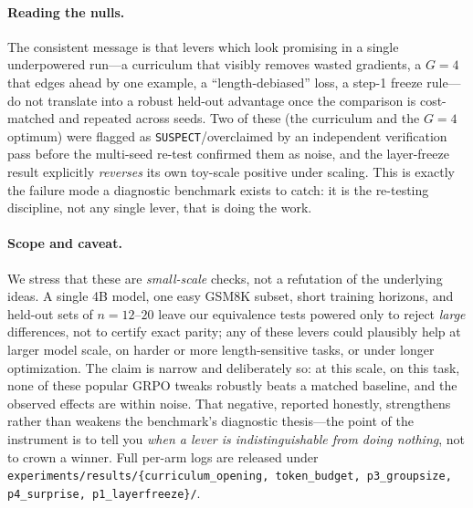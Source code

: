 \paragraph{Reading the nulls.}
The consistent message is that levers which look promising in a single
underpowered run---a curriculum that visibly removes wasted gradients, a
$G{=}4$ that edges ahead by one example, a ``length-debiased'' loss, a
step-1 freeze rule---do not translate into a robust held-out advantage
once the comparison is cost-matched and repeated across seeds. Two of
these (the curriculum and the $G{=}4$ optimum) were flagged as
\texttt{SUSPECT}/overclaimed by an independent verification pass before
the multi-seed re-test confirmed them as noise, and the layer-freeze
result explicitly \emph{reverses} its own toy-scale positive under
scaling. This is exactly the failure mode a diagnostic benchmark exists
to catch: it is the re-testing discipline, not any single lever, that is
doing the work.

\paragraph{Scope and caveat.}
We stress that these are \emph{small-scale} checks, not a refutation of
the underlying ideas. A single 4B model, one easy GSM8K subset, short
training horizons, and held-out sets of $n{=}12$--$20$ leave our
equivalence tests powered only to reject \emph{large} differences, not
to certify exact parity; any of these levers could plausibly help at
larger model scale, on harder or more length-sensitive tasks, or under
longer optimization. The claim is narrow and deliberately so: at this
scale, on this task, none of these popular GRPO tweaks robustly beats a
matched baseline, and the observed effects are within noise. That
negative, reported honestly, strengthens rather than weakens the
benchmark's diagnostic thesis---the point of the instrument is to tell
you \emph{when a lever is indistinguishable from doing nothing}, not to
crown a winner. Full per-arm logs are released under
\texttt{experiments/results/\{curriculum\_opening, token\_budget,
p3\_groupsize, p4\_surprise, p1\_layerfreeze\}/}.
